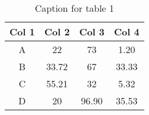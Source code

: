 \begin{table}
    \caption{Caption for table 1}
      \centering
      \begin{tabular}{c c c c }
        \toprule
        \textbf{Col 1} & \textbf{Col 2} & \textbf{Col 3} & \textbf{Col 4}\\
        \midrule
        A & 22 & 73 & 1.20\\
        B & 33.72 & 67 & 33.33\\
        C & 55.21 & 32 & 5.32\\
        {\color{blue}D} & 20 & 96.90 & {\color{blue}35.53}\\
        \bottomrule
      \end{tabular}
      \label{tab:table1}
\end{table}